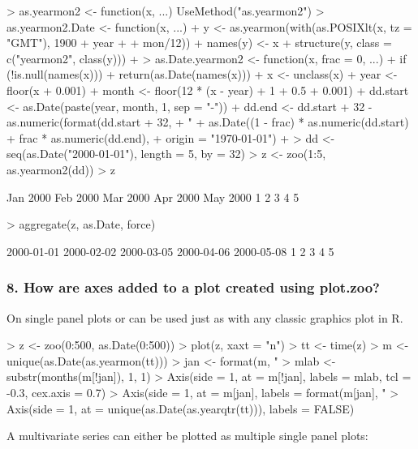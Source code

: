 \documentclass[article,nojss]{jss}
\newcommand{\mysection}[1]{\subsubsection[#1]{\textbf{#1}}}
\begin{document}
\begin{Schunk}
\begin{Sinput}
> as.yearmon2 <- function(x, ...) UseMethod("as.yearmon2")
> as.yearmon2.Date <- function(x, ...) {
+     y <- as.yearmon(with(as.POSIXlt(x, tz = "GMT"), 1900 + year + 
+         mon/12))
+     names(y) <- x
+     structure(y, class = c("yearmon2", class(y)))
+ }
> as.Date.yearmon2 <- function(x, frac = 0, ...) {
+     if (!is.null(names(x))) 
+         return(as.Date(names(x)))
+     x <- unclass(x)
+     year <- floor(x + 0.001)
+     month <- floor(12 * (x - year) + 1 + 0.5 + 0.001)
+     dd.start <- as.Date(paste(year, month, 1, sep = "-"))
+     dd.end <- dd.start + 32 - as.numeric(format(dd.start + 32, 
+         "%
+     as.Date((1 - frac) * as.numeric(dd.start) + frac * as.numeric(dd.end), 
+         origin = "1970-01-01")
+ }
> dd <- seq(as.Date("2000-01-01"), length = 5, by = 32)
> z <- zoo(1:5, as.yearmon2(dd))
> z
\end{Sinput}
\begin{Soutput}
Jan 2000 Feb 2000 Mar 2000 Apr 2000 May 2000 
       1        2        3        4        5 
\end{Soutput}
\begin{Sinput}
> aggregate(z, as.Date, force)
\end{Sinput}
\begin{Soutput}
2000-01-01 2000-02-02 2000-03-05 2000-04-06 2000-05-08 
         1          2          3          4          5 
\end{Soutput}
\end{Schunk}

\mysection{8. How are axes added to a plot created using plot.zoo?}

On single panel plots  or  can be used just as with any 
classic graphics plot in R.

\begin{Schunk}
\begin{Sinput}
> z <- zoo(0:500, as.Date(0:500))
> plot(z, xaxt = "n")
> tt <- time(z)
> m <- unique(as.Date(as.yearmon(tt)))
> jan <- format(m, "%
> mlab <- substr(months(m[!jan]), 1, 1)
> Axis(side = 1, at = m[!jan], labels = mlab, tcl = -0.3, cex.axis = 0.7)
> Axis(side = 1, at = m[jan], labels = format(m[jan], "%
> Axis(side = 1, at = unique(as.Date(as.yearqtr(tt))), labels = FALSE)
\end{Sinput}
\end{Schunk}

A multivariate series can either be plotted as multiple single panel
plots:
\end{document}
